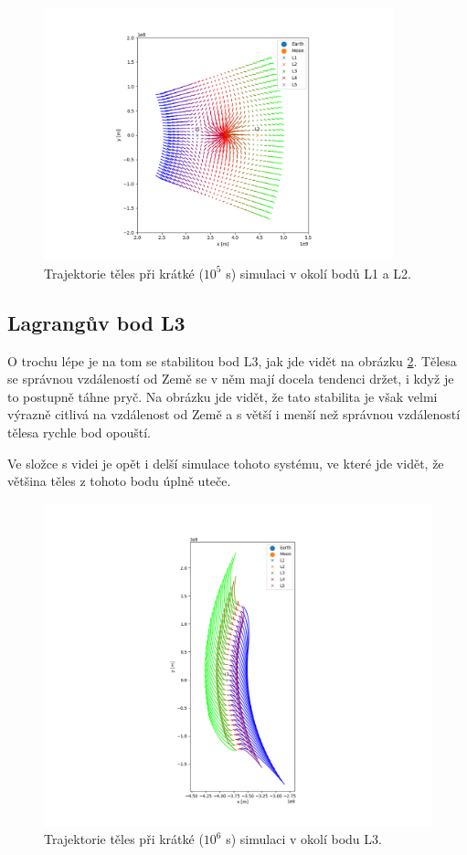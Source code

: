 \documentclass[a4paper,11pt]{article}
\begin{document}
\begin{figure}[h!]
    \centering
    \includegraphics[width=0.9\textwidth]{l12_orbits.png}

    \caption{Trajektorie těles při krátké ($10^5$ s) simulaci v okolí bodů L1 a L2.}
    \label{fig:l12_orbits}
\end{figure}

\subsection{Lagrangův bod L3}

O trochu lépe je na tom se stabilitou bod L3, jak jde vidět na obrázku \ref{fig:l3_orbits}.
Tělesa se správnou vzdáleností od Země se v něm mají docela tendenci držet, i když je to postupně
táhne pryč. Na obrázku jde vidět, že tato stabilita je však velmi výrazně citlivá na vzdálenost od Země
a s větší i menší než správnou vzdáleností tělesa rychle bod opouští.

Ve složce s videi je opět i delší simulace tohoto systému, ve které jde vidět, že většina těles
z tohoto bodu úplně uteče.

\begin{figure}[h!]
    \centering
    \includegraphics[width=.9\textwidth]{l3_orbits.png}

    \caption{Trajektorie těles při krátké ($10^6$ s) simulaci v okolí bodu L3.}
    \label{fig:l3_orbits}
\end{figure}
\end{document}
